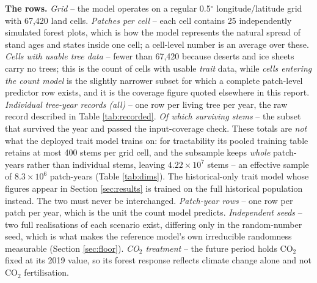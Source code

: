 \documentclass[11pt]{article}
\begin{document}
\begin{table}[h]
{\textbf{The rows.} \emph{Grid} -- the model operates on a regular 0.5$^\circ$ longitude/latitude grid with 67{,}420 land cells. \emph{Patches per cell} -- each cell contains 25 independently simulated forest plots, which is how the model represents the natural spread of stand ages and states inside one cell; a cell-level number is an average over these. \emph{Cells with usable tree data} -- fewer than 67{,}420 because deserts and ice sheets carry no trees; this is the count of cells with usable \emph{trait} data, while \emph{cells entering the count model} is the slightly narrower subset for which a complete patch-level predictor row exists, and it is the coverage figure quoted elsewhere in this report. \emph{Individual tree-year records (all)} -- one row per living tree per year, the raw record described in Table \ref{tab:recorded}. \emph{Of which surviving stems} -- the subset that survived the year and passed the input-coverage check. These totals are \emph{not} what the deployed trait model trains on: for tractability its pooled training table retains at most 400 stems per grid cell, and the subsample keeps \emph{whole} patch-years rather than individual stems, leaving $4.22 \times 10^{7}$ stems -- an effective sample of $8.3 \times 10^{6}$ patch-years (Table \ref{tab:dims}). The historical-only trait model whose figures appear in Section \ref{sec:results} is trained on the full historical population instead. The two must never be interchanged. \emph{Patch-year rows} -- one row per patch per year, which is the unit the count model predicts. \emph{Independent seeds} -- two full realisations of each scenario exist, differing only in the random-number seed, which is what makes the reference model's own irreducible randomness measurable (Section \ref{sec:floor}). \emph{CO$_2$ treatment} -- the future period holds CO$_2$ fixed at its 2019 value, so its forest response reflects climate change alone and not CO$_2$ fertilisation.}
\label{tab:scale}
\small
{}
\end{table}
\end{document}
